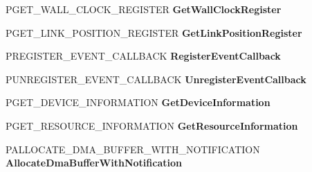 \begin{DoxyCompactItemize}
\item 
\mbox{\label{struct___h_d_a_u_d_i_o___b_u_s___i_n_t_e_r_f_a_c_e___v2_ad2fc8cfc88d0e10d01abbb66abfd289e}} 
P\+G\+E\+T\+\_\+\+W\+A\+L\+L\+\_\+\+C\+L\+O\+C\+K\+\_\+\+R\+E\+G\+I\+S\+T\+ER {\bfseries Get\+Wall\+Clock\+Register}
\item 
\mbox{\label{struct___h_d_a_u_d_i_o___b_u_s___i_n_t_e_r_f_a_c_e___v2_ab55e56540912c4a79476366bd0949de5}} 
P\+G\+E\+T\+\_\+\+L\+I\+N\+K\+\_\+\+P\+O\+S\+I\+T\+I\+O\+N\+\_\+\+R\+E\+G\+I\+S\+T\+ER {\bfseries Get\+Link\+Position\+Register}
\item 
\mbox{\label{struct___h_d_a_u_d_i_o___b_u_s___i_n_t_e_r_f_a_c_e___v2_ab13d8111d4d5834f065a57f7ab14e5b3}} 
P\+R\+E\+G\+I\+S\+T\+E\+R\+\_\+\+E\+V\+E\+N\+T\+\_\+\+C\+A\+L\+L\+B\+A\+CK {\bfseries Register\+Event\+Callback}
\item 
\mbox{\label{struct___h_d_a_u_d_i_o___b_u_s___i_n_t_e_r_f_a_c_e___v2_abbb12d3cea7170fb778e792cee4602c0}} 
P\+U\+N\+R\+E\+G\+I\+S\+T\+E\+R\+\_\+\+E\+V\+E\+N\+T\+\_\+\+C\+A\+L\+L\+B\+A\+CK {\bfseries Unregister\+Event\+Callback}
\item 
\mbox{\label{struct___h_d_a_u_d_i_o___b_u_s___i_n_t_e_r_f_a_c_e___v2_a1b0531f09a8b6fb7af32d4f8c8a983b6}} 
P\+G\+E\+T\+\_\+\+D\+E\+V\+I\+C\+E\+\_\+\+I\+N\+F\+O\+R\+M\+A\+T\+I\+ON {\bfseries Get\+Device\+Information}
\item 
\mbox{\label{struct___h_d_a_u_d_i_o___b_u_s___i_n_t_e_r_f_a_c_e___v2_aebf30f5c2b299721526280ad871dcfd6}} 
P\+G\+E\+T\+\_\+\+R\+E\+S\+O\+U\+R\+C\+E\+\_\+\+I\+N\+F\+O\+R\+M\+A\+T\+I\+ON {\bfseries Get\+Resource\+Information}
\item 
\mbox{\label{struct___h_d_a_u_d_i_o___b_u_s___i_n_t_e_r_f_a_c_e___v2_a0bf68c4577b75a5e4b87f35d5f45f13b}} 
P\+A\+L\+L\+O\+C\+A\+T\+E\+\_\+\+D\+M\+A\+\_\+\+B\+U\+F\+F\+E\+R\+\_\+\+W\+I\+T\+H\+\_\+\+N\+O\+T\+I\+F\+I\+C\+A\+T\+I\+ON {\bfseries Allocate\+Dma\+Buffer\+With\+Notification}

\end{DoxyCompactItemize}
